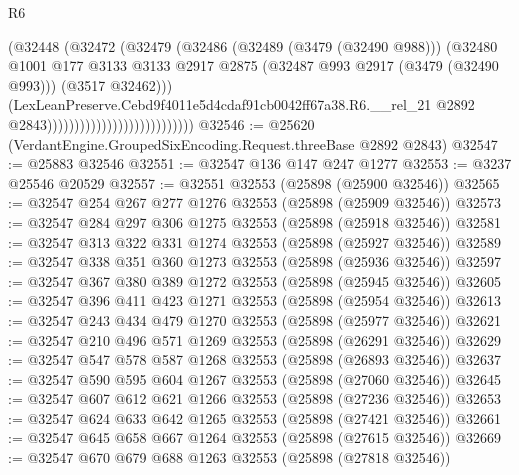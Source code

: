\begin{lexlean}{R6}
\begin{coremodule}
                                                  (@32448
                                                    (@32472
                                                      (@32479
                                                        (@32486
                                                          (@32489 (@3479 (@32490 @988)))
                                                          (@32480
                                                            @1001
                                                            @177
                                                            @3133
                                                            @3133
                                                            @2917
                                                            @2875
                                                            (@32487
                                                              @993
                                                              @2917
                                                              (@3479 (@32490 @993)))
                                                            (@3517 @32462)))
                                                        (LexLeanPreserve.Cebd9f4011e5d4cdaf91cb0042ff67a38.R6.__rel_21
                                                          @2892
                                                          @2843)))))))))))))))))))))))))))
@32546 := @25620 (VerdantEngine.GroupedSixEncoding.Request.threeBase @2892 @2843)
@32547 := @25883 @32546
@32551 := @32547 @136 @147 @247 @1277
@32553 := @3237 @25546 @20529
@32557 := @32551 @32553 (@25898 (@25900 @32546))
@32565 := @32547 @254 @267 @277 @1276 @32553 (@25898 (@25909 @32546))
@32573 := @32547 @284 @297 @306 @1275 @32553 (@25898 (@25918 @32546))
@32581 := @32547 @313 @322 @331 @1274 @32553 (@25898 (@25927 @32546))
@32589 := @32547 @338 @351 @360 @1273 @32553 (@25898 (@25936 @32546))
@32597 := @32547 @367 @380 @389 @1272 @32553 (@25898 (@25945 @32546))
@32605 := @32547 @396 @411 @423 @1271 @32553 (@25898 (@25954 @32546))
@32613 := @32547 @243 @434 @479 @1270 @32553 (@25898 (@25977 @32546))
@32621 := @32547 @210 @496 @571 @1269 @32553 (@25898 (@26291 @32546))
@32629 := @32547 @547 @578 @587 @1268 @32553 (@25898 (@26893 @32546))
@32637 := @32547 @590 @595 @604 @1267 @32553 (@25898 (@27060 @32546))
@32645 := @32547 @607 @612 @621 @1266 @32553 (@25898 (@27236 @32546))
@32653 := @32547 @624 @633 @642 @1265 @32553 (@25898 (@27421 @32546))
@32661 := @32547 @645 @658 @667 @1264 @32553 (@25898 (@27615 @32546))
@32669 := @32547 @670 @679 @688 @1263 @32553 (@25898 (@27818 @32546))

\end{coremodule}
\end{lexlean}

